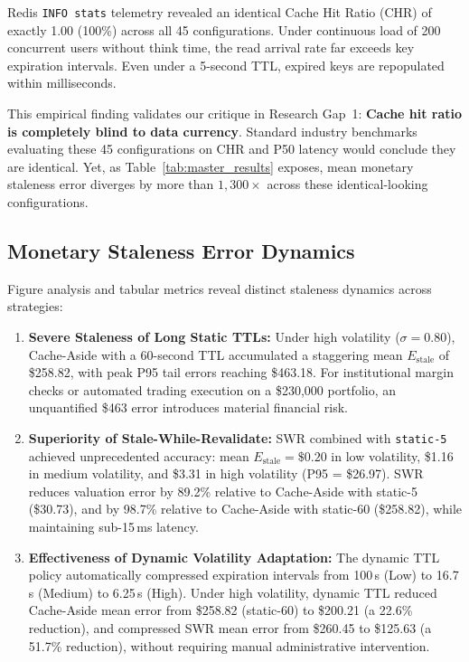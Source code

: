 \documentclass[11pt,a4paper]{article}
\begin{document}
Redis \texttt{INFO stats} telemetry revealed an identical Cache Hit Ratio (CHR) of exactly 1.00 (100\%) across all 45 configurations. Under continuous load of 200 concurrent users without think time, the read arrival rate far exceeds key expiration intervals. Even under a 5-second TTL, expired keys are repopulated within milliseconds.

This empirical finding validates our critique in Research Gap~1: \textbf{Cache hit ratio is completely blind to data currency}. Standard industry benchmarks evaluating these 45 configurations on CHR and P50 latency would conclude they are identical. Yet, as Table~\ref{tab:master_results} exposes, mean monetary staleness error diverges by more than $1{,}300\times$ across these identical-looking configurations.

\subsection{Monetary Staleness Error Dynamics}

Figure analysis and tabular metrics reveal distinct staleness dynamics across strategies:
\begin{enumerate}
  \item \textbf{Severe Staleness of Long Static TTLs:} Under high volatility ($\sigma = 0.80$), Cache-Aside with a 60-second TTL accumulated a staggering mean $E_{\text{stale}}$ of \$258.82, with peak P95 tail errors reaching \$463.18. For institutional margin checks or automated trading execution on a \$230{,}000 portfolio, an unquantified \$463 error introduces material financial risk.
  \item \textbf{Superiority of Stale-While-Revalidate:} SWR combined with \texttt{static-5} achieved unprecedented accuracy: mean $E_{\text{stale}} = \$0.20$ in low volatility, \$1.16 in medium volatility, and \$3.31 in high volatility (P95 = \$26.97). SWR reduces valuation error by 89.2\% relative to Cache-Aside with static-5 (\$30.73), and by 98.7\% relative to Cache-Aside with static-60 (\$258.82), while maintaining sub-15\,ms latency.
  \item \textbf{Effectiveness of Dynamic Volatility Adaptation:} The dynamic TTL policy automatically compressed expiration intervals from 100\,s (Low) to 16.7\,s (Medium) to 6.25\,s (High). Under high volatility, dynamic TTL reduced Cache-Aside mean error from \$258.82 (static-60) to \$200.21 (a 22.6\% reduction), and compressed SWR mean error from \$260.45 to \$125.63 (a 51.7\% reduction), without requiring manual administrative intervention.
\end{enumerate}
\end{document}
